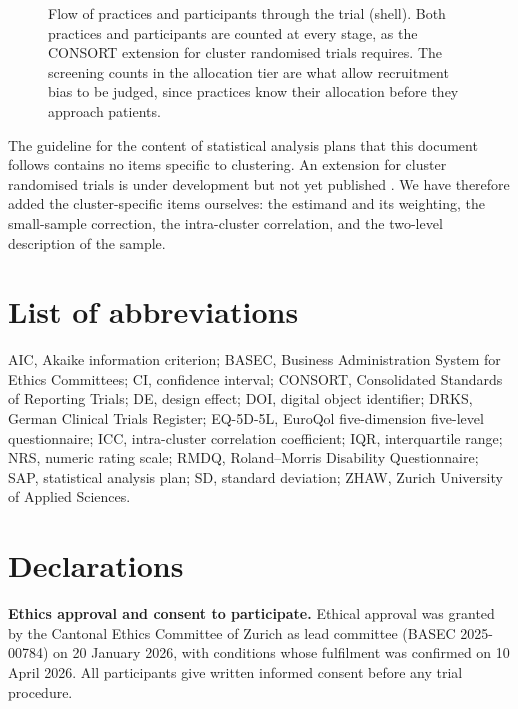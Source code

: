\documentclass[11pt,a4paper]{article}
\begin{document}
\begin{figure}[p]
\caption{Flow of practices and participants through the trial (shell). Both
practices and participants are counted at every stage, as the CONSORT extension
for cluster randomised trials requires. The screening counts in the allocation
tier are what allow recruitment bias to be judged, since practices know their
allocation before they approach patients.}
\label{fig:flow}
\end{figure}

The guideline for the content of statistical analysis plans that this document
follows \citep{gamble2017} contains no items specific to clustering. An
extension for cluster randomised trials is under development but not yet
published \citep{hemming2025sap}. We have therefore added the cluster-specific
items ourselves: the estimand and its weighting, the small-sample correction,
the intra-cluster correlation, and the two-level description of the sample.

\section*{List of abbreviations}

\noindent
AIC, Akaike information criterion;
BASEC, Business Administration System for Ethics Committees;
CI, confidence interval;
CONSORT, Consolidated Standards of Reporting Trials;
DE, design effect;
DOI, digital object identifier;
DRKS, German Clinical Trials Register;
EQ-5D-5L, EuroQol five-dimension five-level questionnaire;
ICC, intra-cluster correlation coefficient;
IQR, interquartile range;
NRS, numeric rating scale;
RMDQ, Roland--Morris Disability Questionnaire;
SAP, statistical analysis plan;
SD, standard deviation;
ZHAW, Zurich University of Applied Sciences.

\section*{Declarations}

\textbf{Ethics approval and consent to participate.} Ethical approval was
granted by the Cantonal Ethics Committee of Zurich as lead committee
(BASEC 2025-00784) on 20 January 2026, with conditions whose fulfilment was
confirmed on 10 April 2026. All participants give written informed consent
before any trial procedure.
\end{document}
